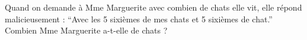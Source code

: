 \documentclass[a4paper,12pt]{report}
\begin{document}
\begin{acti}
Quand on demande à Mme Marguerite avec combien de chats elle vit, elle répond malicieusement : \enquote{Avec les 5 sixièmes de mes chats et 5 sixièmes de chat.} Combien Mme Marguerite a-t-elle de chats ?
\end{acti}
\begin{comment}
	\begin{acti}
Résoudre les équations de l'exercice 81 . [( $\left.{ }^*\right)$ Pour la seconde, utiliser la complétion du carré.]
	\end{acti}
	\begin{acti}
(*) En utilisant des identités remarquables, écrire les nombres suivants sous la forme de deux nombres entiers supérieurs à 1 . (Indiquer les étapes de manière détaillée.)
		\begin{tasks}
\task $1.014 \cdot 049$
\task $899^{\circ} 999^{\circ} 879$
\task $256^{\circ} 027$
\task 159'991
\task $99^{\circ} 940^{\circ} 009$ (pensez à soustraire)
\task $81^{\circ} 053^{\circ} 993$
\task 10'807
\task 491'401
		\end{tasks}
	\end{acti}
\end{comment}
\end{document}
